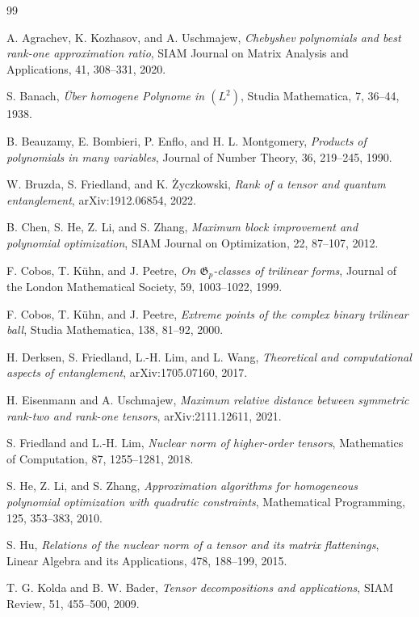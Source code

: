\documentclass[11pt]{article}
\begin{document}
\begin{thebibliography}{99}
\itemsep0pt

 A. Agrachev, K. Kozhasov, and A. Uschmajew, {\em Chebyshev polynomials and best rank-one approximation ratio}, SIAM Journal on Matrix Analysis and Applications, 41, 308--331, 2020.

 S. Banach, {\em \"{U}ber homogene Polynome in $(L^2)$}, Studia Mathematica, 7, 36--44, 1938.

 B. Beauzamy, E. Bombieri, P. Enflo, and H. L. Montgomery, {\em Products of polynomials in many variables}, Journal of Number Theory, 36, 219--245, 1990.

 W. Bruzda, S. Friedland, and K. \.{Z}yczkowski, {\em Rank of a tensor and quantum entanglement}, arXiv:1912.06854, 2022.

 B. Chen, S. He, Z. Li, and S. Zhang, {\em Maximum block improvement and polynomial optimization}, SIAM Journal on Optimization, 22, 87--107, 2012.

 F. Cobos, T. K\"uhn, and J. Peetre, {\em On $\mathfrak{G}_p$-classes of trilinear forms}, Journal of the London Mathematical Society, 59, 1003--1022, 1999.

 F. Cobos, T. K\"uhn, and J. Peetre, {\em Extreme points of the complex binary trilinear ball}, Studia Mathematica, 138, 81--92, 2000.

 H. Derksen, S. Friedland, L.-H. Lim, and L. Wang, {\em Theoretical and computational aspects of entanglement}, arXiv:1705.07160, 2017.

 H. Eisenmann and A. Uschmajew, {\em Maximum relative distance between symmetric rank-two and rank-one tensors}, arXiv:2111.12611, 2021.

 S. Friedland and L.-H. Lim, {\em Nuclear norm of higher-order tensors}, Mathematics of Computation, 87, 1255--1281, 2018.

 S. He, Z. Li, and S. Zhang, {\em Approximation algorithms for homogeneous polynomial optimization with quadratic constraints}, Mathematical Programming, 125, 353--383, 2010.

 S. Hu, {\em Relations of the nuclear norm of a tensor and its matrix flattenings}, Linear Algebra and its Applications, 478, 188--199, 2015.

 T. G. Kolda and B. W. Bader, {\em Tensor decompositions and applications}, SIAM Review, 51, 455--500, 2009.


\end{thebibliography}
\end{document}

